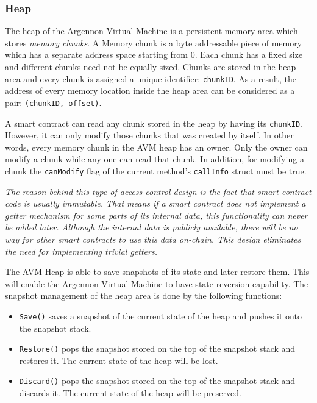 \documentclass[11pt, a4paper]{report}
\newcommand{\note}[1] {
    \begin{tcolorbox}[colframe=white,colback=white]
        \emph{#1}
    \end{tcolorbox}
}
\begin{document}
    \subsubsection{Heap}

    The heap of the Argennon Virtual Machine is a persistent memory area which stores \emph{memory chunks}. A Memory
    chunk is a byte addressable piece of memory which has a separate address space starting from 0. Each chunk has a
    fixed size and different chunks need not be equally sized. Chunks are stored in the heap area and every chunk is
    assigned a unique identifier: \texttt{chunkID}. As a result, the address of every memory location inside
    the heap area can be considered as a pair: \texttt{(chunkID, offset)}.

    A smart contract can read any chunk stored in the heap by having its \texttt{chunkID}. However, it can only modify
    those chunks that was created by itself. In other words, every memory chunk in the AVM heap has an owner. Only
    the owner can modify a chunk while any one can read that chunk. In addition, for modifying a chunk the \texttt{canModify}
    flag of the current method's \texttt{callInfo} struct must be true.

    \note{The reason behind this type of access control design is the fact that smart contract code is usually
    immutable. That means if a smart contract does not implement a getter mechanism for some parts of its internal
    data, this functionality can never be added later. Although the internal data is publicly available, there will
    be no way for other smart contracts to use this data on-chain. This design eliminates the need for implementing
    \emph{trivial} getters.}

    The AVM Heap is able to save snapshots of its state and later restore them. This will enable the Argennon
    Virtual Machine to have state reversion capability. The snapshot management of the heap area is done by
    the following functions:
    \begin{itemize}
        \item \texttt{Save()} saves a snapshot of the current state of the heap and pushes it onto the
        snapshot stack.
        \item \texttt{Restore()} pops the snapshot stored on the top of the snapshot stack and restores it. The
        current state of the heap will be lost.
        \item \texttt{Discard()} pops the snapshot stored on the top of the snapshot stack and discards it. The current
        state of the heap will be preserved.
    \end{itemize}
\end{document}

